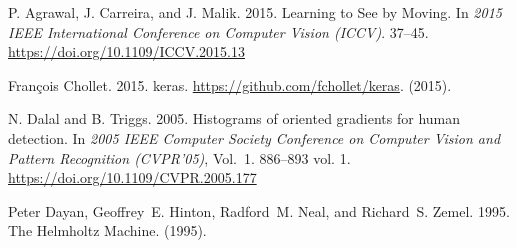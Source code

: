 \documentclass[sigconf,authorversion=true]{aamas}  %
\begin{document}
\begin{thebibliography}{00}


\ifx \showCODEN    \undefined {}     \fi
\ifx \showDOI      \undefined \def \showDOI       #1{#1}\fi
\ifx \showISBNx    \undefined \def \showISBNx     #1{\unskip}     \fi
\ifx \showISBNxiii \undefined \def \showISBNxiii  #1{\unskip}     \fi
\ifx \showISSN     \undefined \def \showISSN      #1{\unskip}     \fi
\ifx \showLCCN     \undefined \def \showLCCN      #1{\unskip}     \fi
\ifx \shownote     \undefined \def \shownote      #1{#1}          \fi
\ifx \showarticletitle \undefined \def \showarticletitle #1{#1}   \fi
\ifx \showURL      \undefined \def \showURL{\relax}        \fi
\providecommand\bibfield[2]{#2}
\providecommand\bibinfo[2]{#2}
\providecommand\natexlab[1]{#1}
\providecommand\showeprint[2][]{arXiv:#2}

\bibfield{author}{\bibinfo{person}{P. Agrawal}, \bibinfo{person}{J. Carreira},
  {and} \bibinfo{person}{J. Malik}.} \bibinfo{year}{2015}\natexlab{}.
\newblock \showarticletitle{Learning to See by Moving}. In
  \bibinfo{booktitle}{{\em 2015 IEEE International Conference on Computer
  Vision (ICCV)}}. \bibinfo{pages}{37--45}.
\newblock
\showDOI{%
\url{https://doi.org/10.1109/ICCV.2015.13}}


\bibfield{author}{\bibinfo{person}{Fran\c{c}ois Chollet}.}
  \bibinfo{year}{2015}\natexlab{}.
\newblock \bibinfo{title}{keras}.
\newblock \bibinfo{howpublished}{\url{https://github.com/fchollet/keras}}.
  (\bibinfo{year}{2015}).
\newblock


\bibfield{author}{\bibinfo{person}{N. Dalal} {and} \bibinfo{person}{B.
  Triggs}.} \bibinfo{year}{2005}\natexlab{}.
\newblock \showarticletitle{Histograms of oriented gradients for human
  detection}. In \bibinfo{booktitle}{{\em 2005 IEEE Computer Society Conference
  on Computer Vision and Pattern Recognition (CVPR'05)}},
  Vol.~\bibinfo{volume}{1}. \bibinfo{pages}{886--893 vol. 1}.
\newblock
\showISSN{1063-6919}
\showDOI{%
\url{https://doi.org/10.1109/CVPR.2005.177}}


\bibfield{author}{\bibinfo{person}{Peter Dayan}, \bibinfo{person}{Geoffrey~E.
  Hinton}, \bibinfo{person}{Radford~M. Neal}, {and} \bibinfo{person}{Richard~S.
  Zemel}.} \bibinfo{year}{1995}\natexlab{}.
\newblock \bibinfo{title}{The Helmholtz Machine}.
\newblock   (\bibinfo{year}{1995}).
\newblock



\end{thebibliography}
\end{document}
